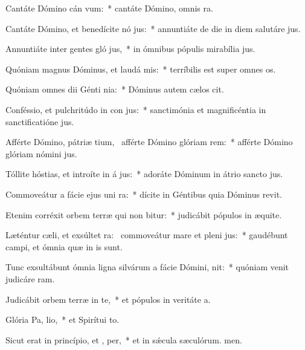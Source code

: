 \item Cantáte Dómino cán vum:~* cantáte Dómino, omnis ra.
\item Cantáte Dómino, et benedícite nó jus:~* annuntiáte de die in diem salutáre jus.
\item Annuntiáte inter gentes gló jus,~* in ómnibus pópulis mirabília jus.
\item Quóniam magnus Dóminus, et laudá mis:~* terríbilis est super omnes os.
\item Quóniam omnes dii Génti nia:~* Dóminus autem cælos cit.
\item Conféssio, et pulchritúdo in con jus:~* sanctimónia et magnificéntia in sanctificatióne jus.
\item Afférte Dómino, pátriæ tium,~\pscross{} afférte Dómino glóriam  rem:~* afférte Dómino glóriam nómini jus.
\item Tóllite hóstias, et introíte in á jus:~* adoráte Dóminum in átrio sancto jus.
\item Commoveátur a fácie ejus uni ra:~* dícite in Géntibus quia Dóminus revit.
\item Etenim corréxit orbem terræ qui non bitur:~* judicábit pópulos in æquite.
\item Læténtur cæli, et exsúltet ra:~\pscross{} commoveátur mare et pleni jus:~* gaudébunt campi, et ómnia quæ in is sunt.
\item Tunc exsultábunt ómnia ligna silvárum a fácie Dómini,  nit:~* quóniam venit judicáre ram.
\item Judicábit orbem terræ in te,~* et pópulos in veritáte a.
\item Glória Pa,  lio,~* et Spirítui to.
\item Sicut erat in princípio, et ,  per,~* et in sǽcula sæculórum. men.
